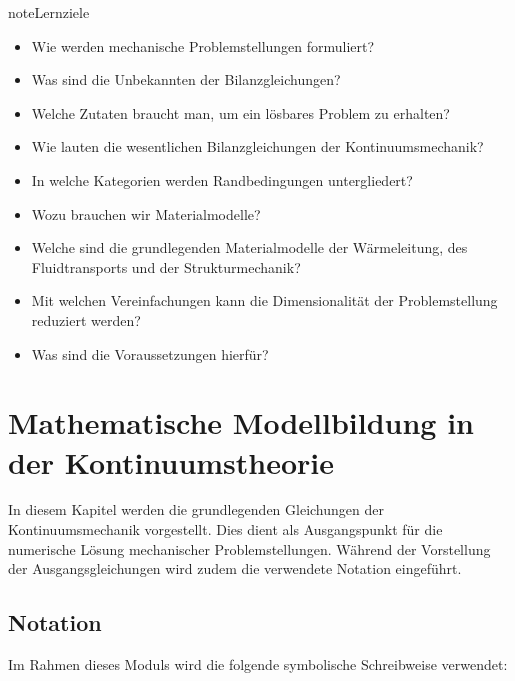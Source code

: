 \documentclass[letterpaper,10pt,german]{jupyterBook}
\begin{document}
\begin{sphinxadmonition}{note}{Lernziele}
\begin{itemize}
\item {} 
\sphinxAtStartPar
Wie werden mechanische Problemstellungen formuliert?

\item {} 
\sphinxAtStartPar
Was sind die Unbekannten der Bilanzgleichungen?

\item {} 
\sphinxAtStartPar
Welche Zutaten braucht man, um ein lösbares Problem zu erhalten?

\item {} 
\sphinxAtStartPar
Wie lauten die wesentlichen Bilanzgleichungen der Kontinuumsmechanik?

\item {} 
\sphinxAtStartPar
In welche Kategorien werden Randbedingungen untergliedert?

\item {} 
\sphinxAtStartPar
Wozu brauchen wir Materialmodelle?

\item {} 
\sphinxAtStartPar
Welche sind die grundlegenden Materialmodelle der Wärmeleitung, des Fluidtransports und der Strukturmechanik?

\item {} 
\sphinxAtStartPar
Mit welchen Vereinfachungen kann die Dimensionalität der Problemstellung reduziert werden?

\item {} 
\sphinxAtStartPar
Was sind die Voraussetzungen hierfür?

\end{itemize}
\end{sphinxadmonition}


\section{Mathematische Modellbildung in der Kontinuumstheorie}
\label{\detokenize{chapters/chapter1/elasticity:mathematische-modellbildung-in-der-kontinuumstheorie}}\label{\detokenize{chapters/chapter1/elasticity::doc}}
\sphinxAtStartPar
In diesem Kapitel werden die grundlegenden Gleichungen der Kontinuumsmechanik vorgestellt. Dies dient als Ausgangspunkt für die numerische Lösung mechanischer Problemstellungen. Während der Vorstellung der Ausgangsgleichungen wird zudem die verwendete Notation eingeführt.


\subsection{Notation}
\label{\detokenize{chapters/chapter1/elasticity:notation}}
\sphinxAtStartPar
Im Rahmen dieses Moduls wird die folgende symbolische Schreibweise verwendet:
\end{document}
